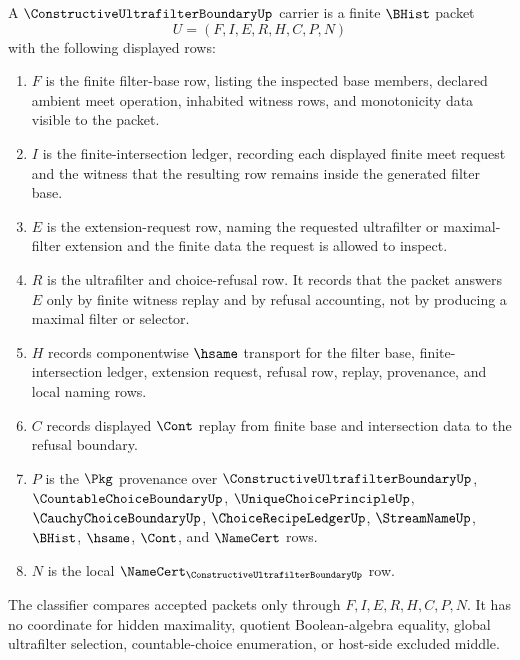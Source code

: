 \begin{definition}
\label{def:constructive-ultrafilter-boundary-carrier}
A $\ConstructiveUltrafilterBoundaryUp$ carrier is a finite $\BHist$ packet
$$
U=(F,I,E,R,H,C,P,N)
$$
with the following displayed rows:
\begin{enumerate}
\item $F$ is the finite filter-base row, listing the inspected base members, declared ambient meet operation, inhabited witness rows, and monotonicity data visible to the packet.
\item $I$ is the finite-intersection ledger, recording each displayed finite meet request and the witness that the resulting row remains inside the generated filter base.
\item $E$ is the extension-request row, naming the requested ultrafilter or maximal-filter extension and the finite data the request is allowed to inspect.
\item $R$ is the ultrafilter and choice-refusal row. It records that the packet answers $E$ only by finite witness replay and by refusal accounting, not by producing a maximal filter or selector.
\item $H$ records componentwise $\hsame$ transport for the filter base, finite-intersection ledger, extension request, refusal row, replay, provenance, and local naming rows.
\item $C$ records displayed $\Cont$ replay from finite base and intersection data to the refusal boundary.
\item $P$ is the $\Pkg$ provenance over $\ConstructiveUltrafilterBoundaryUp$, $\CountableChoiceBoundaryUp$, $\UniqueChoicePrincipleUp$, $\CauchyChoiceBoundaryUp$, $\ChoiceRecipeLedgerUp$, $\StreamNameUp$, $\BHist$, $\hsame$, $\Cont$, and $\NameCert$ rows.
\item $N$ is the local $\NameCert_{\ConstructiveUltrafilterBoundaryUp}$ row.
\end{enumerate}
The classifier compares accepted packets only through $F,I,E,R,H,C,P,N$. It has no coordinate for hidden maximality, quotient Boolean-algebra equality, global ultrafilter selection, countable-choice enumeration, or host-side excluded middle.
\end{definition}

